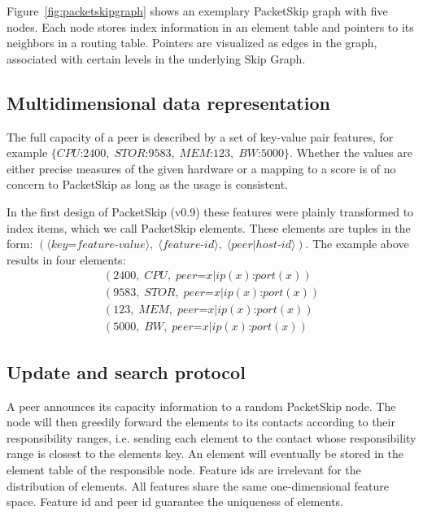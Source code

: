 Figure~\ref{fig:packetskipgraph} shows an exemplary PacketSkip graph with five nodes. Each node stores index information in an element table and pointers to its neighbors in a routing table. Pointers are visualized as edges in the graph, associated with certain levels in the underlying Skip Graph.

\subsection{Multidimensional data representation}
\label{subsec:datarepresentation}

The full capacity of a peer is described by a set of key-value pair features, for example
$\{CPU\text{:}2400,\;STOR\text{:}9583,\;MEM\text{:}123,\;BW\text{:}5000\}$. 
Whether the values are either precise measures of the given hardware or a mapping to a score is of no concern to PacketSkip as long as the usage is consistent.

In the first design of PacketSkip (v0.9) these features were plainly transformed to index items, which we call PacketSkip elements. These elements are tuples in the form: 
$(\langle key\text{=}feature\text{-}value\rangle,\;\langle feature\text{-}id\rangle,\;\langle peer | host\text{-}id\rangle)$. 
The example above results in four elements:
\begin{equation*}
\begin{split}
(2400,\;CPU, \;peer\text{=}x | ip(x)\text{:}port(x)) \\
(9583,\;STOR,\;peer\text{=}x | ip(x)\text{:}port(x)) \\
(123, \;MEM, \;peer\text{=}x | ip(x)\text{:}port(x)) \\
(5000,\;BW,  \;peer\text{=}x | ip(x)\text{:}port(x))
\end{split}
\end{equation*}

\subsection{Update and search protocol}
\label{subsec:updateandsearch}

A peer announces its capacity information to a random PacketSkip node. The node will then greedily forward the elements to its contacts according to their responsibility ranges, i.e. sending each element to the contact whose responsibility range is closest to the elements key. An element will eventually be stored in the element table of the responsible node. Feature ids are irrelevant for the distribution of elements. All features share the same one-dimensional feature space. Feature id and peer id guarantee the uniqueness of elements.

